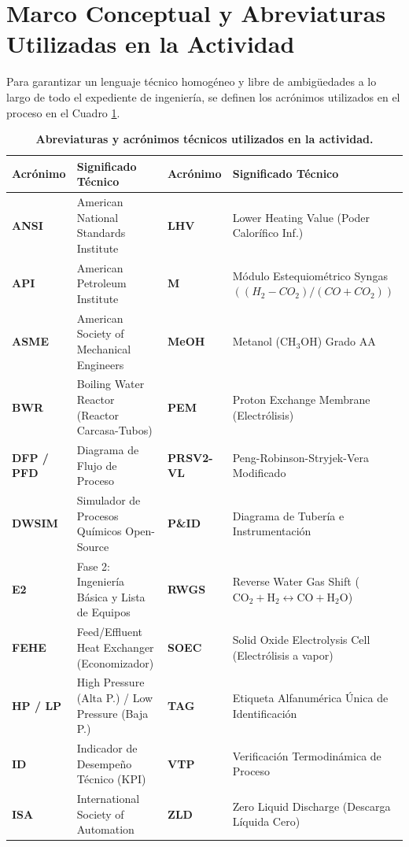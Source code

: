 \documentclass[10pt,letterpaper]{article}
\begin{document}
\section{Marco Conceptual y Abreviaturas Utilizadas en la Actividad}

Para garantizar un lenguaje técnico homogéneo y libre de ambigüedades a lo largo de todo el expediente de ingeniería, se definen los acrónimos utilizados en el proceso en el Cuadro \ref{tab:cuadro1}.

\begin{table}[H]
\centering
\small
\caption{\textbf{Abreviaturas y acrónimos técnicos utilizados en la actividad.}} \label{tab:cuadro1}
\begin{tabularx}{\textwidth}{l p{4.2cm} l p{5.5cm}}
\toprule
\textbf{Acrónimo} & \textbf{Significado Técnico} & \textbf{Acrónimo} & \textbf{Significado Técnico} \\
\midrule
\textbf{ANSI} & American National Standards Institute & \textbf{LHV} & Lower Heating Value (Poder Calorífico Inf.) \\
\textbf{API} & American Petroleum Institute & \textbf{M} & Módulo Estequiométrico Syngas $((H_2-CO_2)/(CO+CO_2))$ \\
\textbf{ASME} & American Society of Mechanical Engineers & \textbf{MeOH} & Metanol ($\text{CH}_3\text{OH}$) Grado AA \\
\textbf{BWR} & Boiling Water Reactor (Reactor Carcasa-Tubos) & \textbf{PEM} & Proton Exchange Membrane (Electrólisis) \\
\textbf{DFP / PFD} & Diagrama de Flujo de Proceso & \textbf{PRSV2-VL} & Peng-Robinson-Stryjek-Vera Modificado \\
\textbf{DWSIM} & Simulador de Procesos Químicos Open-Source & \textbf{P\&ID} & Diagrama de Tubería e Instrumentación \\
\textbf{E2} & Fase 2: Ingeniería Básica y Lista de Equipos & \textbf{RWGS} & Reverse Water Gas Shift ($\text{CO}_2 + \text{H}_2 \leftrightarrow \text{CO} + \text{H}_2\text{O}$) \\
\textbf{FEHE} & Feed/Effluent Heat Exchanger (Economizador) & \textbf{SOEC} & Solid Oxide Electrolysis Cell (Electrólisis a vapor) \\
\textbf{HP / LP} & High Pressure (Alta P.) / Low Pressure (Baja P.) & \textbf{TAG} & Etiqueta Alfanumérica Única de Identificación \\
\textbf{ID} & Indicador de Desempeño Técnico (KPI) & \textbf{VTP} & Verificación Termodinámica de Proceso \\
\textbf{ISA} & International Society of Automation & \textbf{ZLD} & Zero Liquid Discharge (Descarga Líquida Cero) \\
\bottomrule
\end{tabularx}
\end{table}
\end{document}
